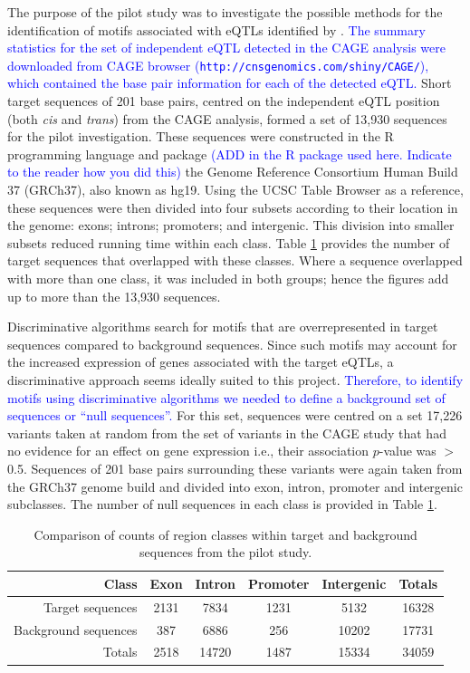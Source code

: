 \documentclass[12pt]{article}
\begin{document}
The purpose of the pilot study was to investigate the possible methods for the identification of motifs associated with eQTLs identified by  \citet{lloyd2017genetic}. \textcolor{blue}{The summary statistics for the set of independent eQTL detected in the CAGE analysis were downloaded from
CAGE browser (\texttt{http://cnsgenomics.com/shiny/CAGE/}), which contained the base pair information for each of the detected eQTL.} Short target sequences of 201 base pairs, centred on the independent eQTL position (both \emph{cis} and \emph{trans}) from the CAGE analysis, formed a set of 13,930 sequences for the pilot investigation. These sequences were constructed in the R programming language \citep{R2016} and package \textcolor{blue}{(ADD in the R package used here. Indicate to the reader how you did this)} the Genome Reference Consortium Human Build 37 (GRCh37)\citep{Lander2001}, also known as hg19. Using the UCSC Table Browser \citep{karolchik2004ucsc} as a reference, these sequences were then divided into four subsets according to their location in the genome: exons; introns; promoters; and intergenic. This division into smaller subsets reduced running time within each class. Table \ref{freqComparisons} provides the number of target sequences that overlapped with these classes. Where a sequence overlapped with more than one class, it was included in both groups; hence the figures add up to more than the 13,930 sequences.

Discriminative algorithms search for motifs that are overrepresented in target sequences compared to background sequences. Since such motifs may account for the increased expression of genes associated with the target eQTLs, a discriminative approach seems ideally suited to this project.  \textcolor{blue}{Therefore, to identify motifs using discriminative algorithms we needed to define a background set of sequences or ``null sequences''.} For this set, sequences were centred on a set 17,226 variants taken at random from the set of variants in the CAGE study that had no evidence for an effect on gene expression i.e., their association $p$-value was $>$ 0.5. Sequences of 201 base pairs surrounding these variants were again taken from the GRCh37 genome build and divided into exon, intron, promoter and intergenic subclasses. The number of null sequences in each class is provided in Table \ref{freqComparisons}. 

\begin{table}[!htbp]
\centering
\caption{Comparison of counts of region classes within target and background sequences from the pilot study.}\label{freqComparisons}
\begin{tabular}{rccccc}
 \toprule[0.2em]
Class & Exon & Intron & Promoter & Intergenic & Totals\\ 
\midrule[0.1em]
Target sequences & 2131 & 7834 & 1231 & 5132 & 16328\\
Background sequences & 387 & 6886 & 256 & 10202 & 17731\\
Totals & 2518 & 14720 & 1487 & 15334 & 34059\\
\bottomrule[0.2em]
\end{tabular}
\end{table} 
\newpage
\end{document}
